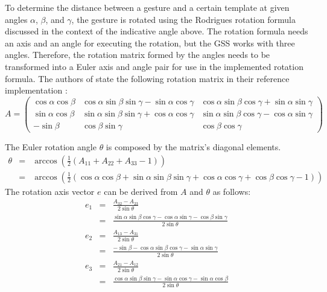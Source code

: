 To determine the distance between a gesture and a certain template at given angles $\alpha$, $\beta$, and $\gamma$, the gesture is rotated using the Rodrigues rotation formula discussed in the context of the indicative angle above. The rotation formula needs an axis and an angle for executing the rotation, but the \ac{GSS} works with three angles. Therefore, the rotation matrix formed by the angles needs to be transformed into a Euler axis and angle pair for use in the implemented rotation formula. The authors of \cite{Kratz2010} state the following rotation matrix in their reference implementation \cite{repo:3dollar}:
\[
A = 
\begin{pmatrix}
\cos{\alpha}\cos{\beta} & \cos{\alpha}\sin{\beta}\sin{\gamma} - \sin{\alpha}\cos{\gamma} & \cos{\alpha}\sin{\beta}\cos{\gamma} + \sin{\alpha}\sin{\gamma} \\
\sin{\alpha}\cos{\beta} & \sin{\alpha}\sin{\beta}\sin{\gamma} + \cos{\alpha}\cos{\gamma} & \sin{\alpha}\sin{\beta}\cos{\gamma} - \cos{\alpha}\sin{\gamma} \\
-\sin{\beta} & \cos{\beta}\sin{\gamma} & \cos{\beta}\cos{\gamma}
\end{pmatrix}
\]

The Euler rotation angle $ \theta $ is composed by the matrix's diagonal elements.
\begin{eqnarray*} %
\theta & = & \arccos(\frac{1}{2}(A_{11} + A_{22} + A_{33} - 1)) \\
       & = & \arccos(\frac{1}{2}(\cos\alpha\cos\beta+\sin\alpha\sin\beta\sin\gamma+\cos\alpha\cos\gamma+\cos\beta\cos\gamma-1))
\end{eqnarray*}
The rotation axis vector $ e $ can be derived from $ A $ and $ \theta $ as follows:
\begin{eqnarray*}
e_1 & = &  \frac{A_{32} - A_{23}}{2\sin\theta} \\
    & = & \frac{\sin\alpha\sin\beta\cos\gamma-\cos\alpha\sin\gamma-\cos\beta\sin\gamma}{2\sin\theta} \\
e_2 & = & \frac{A_{13} - A_{31}}{2\sin\theta} \\
    & = & \frac{-\sin\beta-\cos\alpha\sin\beta\cos\gamma-\sin\alpha\sin\gamma}{2\sin\theta} \\
e_3 & = & \frac{A_{21} - A_{12}}{2\sin\theta} \\
    & = & \frac{\cos\alpha\sin\beta\sin\gamma-\sin\alpha\cos\gamma-\sin\alpha\cos\beta}{2\sin\theta}
\end{eqnarray*}

